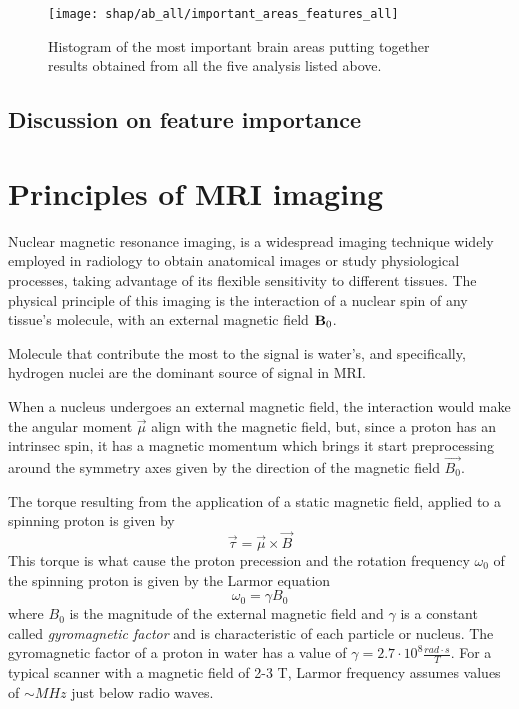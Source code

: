 \documentclass[10pt]{report}
\begin{document}
\begin{figure}[h]
\centering
  \texttt{[image: shap/ab\_all/important\_areas\_features\_all]}
\caption{Histogram of the most important brain areas putting together results obtained from all the five analysis listed above.}
\label{fig:important_areas_features_all}
\end{figure}

\section{Discussion on feature importance}




\newpage


\appendix
\chapter{Principles of MRI imaging}
Nuclear magnetic resonance imaging, is a widespread imaging technique widely employed in radiology to obtain anatomical images or study physiological processes, taking advantage of its flexible sensitivity to different tissues.
The physical principle of this imaging is the interaction of a nuclear spin of any tissue's molecule, with an external magnetic field $\textbf B_0$.

Molecule that contribute the most to the signal is water's, and specifically, hydrogen nuclei are the dominant source of signal in MRI.

When a nucleus undergoes an external magnetic field, the interaction would make the angular moment $\overrightarrow{\mu}$ align with the magnetic field,
but, since a proton has an intrinsec spin, it has a magnetic momentum which brings it start preprocessing
around the symmetry axes given by the direction of the magnetic field $\overrightarrow{B_0}$.

The torque resulting from the application of a static magnetic field, applied to a spinning proton is given by
\begin{equation}
\overrightarrow{\tau} = \overrightarrow{\mu} \times \overrightarrow{B}
\end{equation}
This torque is what cause the proton precession and the rotation frequency $\omega_0$ of the spinning proton is given by the Larmor equation
\begin{equation}\label{eq:larmorfrequency}
\omega_0 = \gamma B_0
\end{equation}
where $B_0$ is the magnitude of the external magnetic field and $\gamma$ is a constant called \emph{gyromagnetic factor} and is characteristic of each particle or nucleus.
The gyromagnetic factor of a proton in water has a value of $\gamma = 2.7\cdot 10^8 \frac{rad\cdot s}{T}$.
For a typical scanner with a magnetic field of 2-3 T, Larmor frequency assumes values of $\sim MHz$ just below radio waves.
\end{document}
